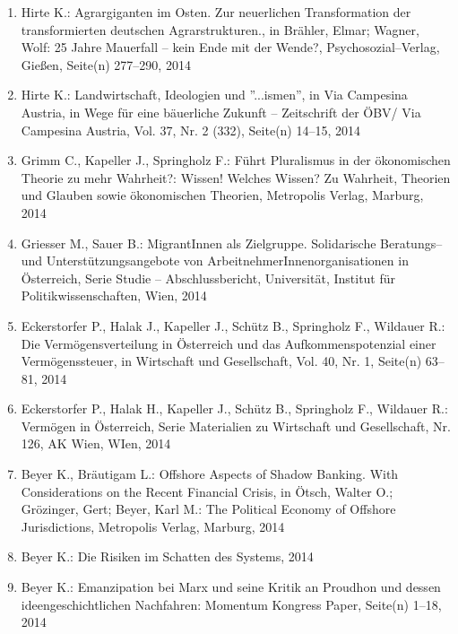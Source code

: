 \begin{enumerate}
	 \item Hirte K.: Agrargiganten im Osten. Zur neuerlichen Transformation der transformierten deutschen Agrarstrukturen., in Brähler, Elmar; Wagner, Wolf: 25 Jahre Mauerfall – kein Ende mit der Wende?, Psychosozial--Verlag, Gießen, Seite(n) 277--­290, 2014
	 \item Hirte K.: Landwirtschaft, Ideologien und ''...ismen'', in Via Campesina Austria, in Wege für eine bäuerliche Zukunft – Zeitschrift der ÖBV/ Via Campesina Austria, Vol. 37, Nr. 2 (332), Seite(n) 14--15, 2014
	 \item Grimm C., Kapeller J., Springholz F.: Führt Pluralismus in der ökonomischen Theorie zu mehr Wahrheit?: Wissen! Welches Wissen? Zu Wahrheit, Theorien und Glauben sowie ökonomischen Theorien, Metropolis Verlag, Marburg, 2014
	 \item Griesser M., Sauer B.: MigrantInnen als Zielgruppe. Solidarische Beratungs-- und Unterstützungsangebote von ArbeitnehmerInnenorganisationen in Österreich, Serie Studie -- Abschlussbericht, Universität, Institut für Politikwissenschaften, Wien, 2014
	 \item Eckerstorfer P., Halak J., Kapeller J., Schütz B., Springholz F., Wildauer R.: Die Vermögensverteilung in Österreich und das Aufkommenspotenzial einer Vermögenssteuer, in Wirtschaft und Gesellschaft, Vol. 40, Nr. 1, Seite(n) 63--81, 2014
	 \item Eckerstorfer P., Halak H., Kapeller J., Schütz B., Springholz F., Wildauer R.: Vermögen in Österreich, Serie Materialien zu Wirtschaft und Gesellschaft, Nr. 126, AK Wien, WIen, 2014
	 \item Beyer K., Bräutigam L.: Offshore Aspects of Shadow Banking. With Considerations on the Recent Financial Crisis, in Ötsch, Walter O.; Grözinger, Gert; Beyer, Karl M.: The Political Economy of Offshore Jurisdictions, Metropolis Verlag, Marburg, 2014
	 \item Beyer K.: Die Risiken im Schatten des Systems, 2014
	 \item Beyer K.: Emanzipation bei Marx und seine Kritik an Proudhon und dessen ideengeschichtlichen Nachfahren: Momentum Kongress Paper, Seite(n) 1--18, 2014
\end{enumerate}
